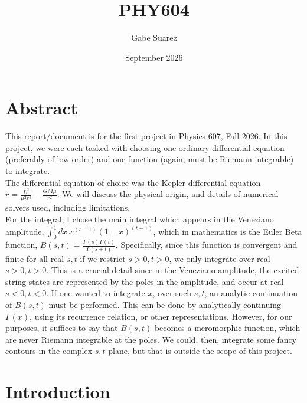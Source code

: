 \documentclass{article}
\title{PHY604}
\author{Gabe Suarez}
\date{September 2026}
\begin{document}
\maketitle

\section{Abstract}



This report/document is for the first project in Physics 607, Fall 2026. In this project, we were each tasked with choosing one ordinary differential equation (preferably of low order) and one function (again, must be Riemann integrable) to integrate. \\The differential equation of choice was the Kepler differential equation $\ddot{r}=\frac{L^2}{\mu^2 r^3}-\frac{G M \mu}{r^2}$. We will discuss the physical origin, and details of numerical solvers used, including limitations. \\ For the integral, I chose the main integral which appears in the Veneziano amplitude, $\int_0^1 dx\: x^{(s-1)}(1-x)^{(t-1)}$, which in mathematics is the Euler Beta function, $B(s,t)=\frac{\Gamma(s)\Gamma(t)}{\Gamma(s+t)}$. Specifically, since this function is convergent and finite for all real $s,t$ if we restrict $s>0,t>0$, we only integrate over real $s>0,t>0$. This is a crucial detail since in the Veneziano amplitude, the excited string states are represented by the poles in the amplitude, and occur at real $s<0,t<0$. If one wanted to integrate $x$, over such $s,t$, an analytic continuation of $B(s,t)$ must be performed. This can be done by analytically continuing $\Gamma(x)$, using its recurrence relation, or other representations. However, for our purposes, it suffices to say that $B(s,t)$ becomes a meromorphic function, which are never Riemann integrable at the poles. We could, then, integrate some fancy contours in the complex $s,t$ plane, but that is outside the scope of this project. 

\section{Introduction}
\end{document}
